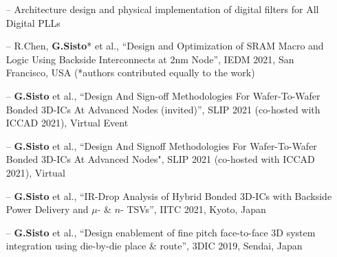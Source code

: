\documentclass[10pt,a4paper,fancychapters]{altacv}
\begin{document}


\begin{itemize}
    \setlength{\itemindent}{0.5em}
    \item[--]  \small {Architecture design and physical implementation of digital filters for All Digital PLLs}
    
\end{itemize}



\begin{fullwidth}
\begin{itemize}
    \setlength{\itemindent}{0.5em}
    \item[--] \small{R.Chen, \textbf{G.Sisto}*  et al., ``Design and Optimization of SRAM Macro and Logic Using Backside
    Interconnects at 2nm Node'', IEDM 2021, San Francisco, USA (*authors contributed equally to the work)} 
    \item[--] \small{\textbf{G.Sisto}  et al., ``Design And Sign-off Methodologies For
    Wafer-To-Wafer Bonded 3D-ICs At Advanced Nodes (invited)'', SLIP 2021 (co-hosted with ICCAD 2021), Virtual Event} 
    \item[--] \small{\textbf{G.Sisto} et al., ``Design
    And Signoff Methodologies For Wafer-To-Wafer Bonded 3D-ICs At Advanced Nodes", SLIP 2021 (co-hosted with ICCAD
    2021), Virtual} 
    \item[--] \small{\textbf{G.Sisto} et al., ``IR-Drop Analysis of Hybrid Bonded 3D-ICs with Backside Power Delivery and $\mu$- \& $n$- TSVs'', IITC 2021, Kyoto, Japan} 
    \item[--] \small{\textbf{G.Sisto} et al., ``Design enablement of fine pitch face-to-face 3D system integration using die-by-die place \& route'', 3DIC 2019, Sendai, Japan}
\end{itemize}
\end{fullwidth}
\end{document}
